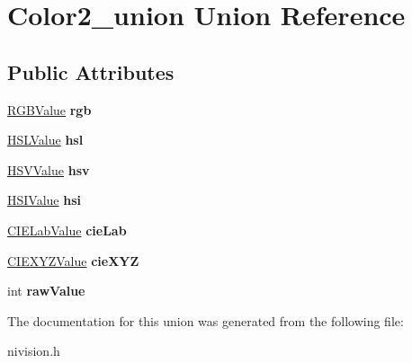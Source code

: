\hypertarget{unionColor2__union}{
\section{Color2\_\-union Union Reference}
\label{unionColor2__union}
}
\subsection*{Public Attributes}
\begin{DoxyCompactItemize}
\item 
\hypertarget{unionColor2__union_a80cbbcacb2b7b797451fd6848294b5d8}{
\hyperlink{structRGBValue__struct}{RGBValue} {\bfseries rgb}}
\label{unionColor2__union_a80cbbcacb2b7b797451fd6848294b5d8}

\item 
\hypertarget{unionColor2__union_a68ca8d690d2c0e9e8441b41ef8e46390}{
\hyperlink{structHSLValue__struct}{HSLValue} {\bfseries hsl}}
\label{unionColor2__union_a68ca8d690d2c0e9e8441b41ef8e46390}

\item 
\hypertarget{unionColor2__union_aa3e35262e49838b6399f193ba04b8925}{
\hyperlink{structHSVValue__struct}{HSVValue} {\bfseries hsv}}
\label{unionColor2__union_aa3e35262e49838b6399f193ba04b8925}

\item 
\hypertarget{unionColor2__union_a8491abb537c1c5edf05b50f0533207f0}{
\hyperlink{structHSIValue__struct}{HSIValue} {\bfseries hsi}}
\label{unionColor2__union_a8491abb537c1c5edf05b50f0533207f0}

\item 
\hypertarget{unionColor2__union_a63de8b4911f4638c7197b82130cb7d11}{
\hyperlink{structCIELabValue__struct}{CIELabValue} {\bfseries cieLab}}
\label{unionColor2__union_a63de8b4911f4638c7197b82130cb7d11}

\item 
\hypertarget{unionColor2__union_a146246adceafca16c845453cf27a231c}{
\hyperlink{structCIEXYZValue__struct}{CIEXYZValue} {\bfseries cieXYZ}}
\label{unionColor2__union_a146246adceafca16c845453cf27a231c}

\item 
\hypertarget{unionColor2__union_aa3d1d3760c0a471d565ac9d9f2458959}{
int {\bfseries rawValue}}
\label{unionColor2__union_aa3d1d3760c0a471d565ac9d9f2458959}

\end{DoxyCompactItemize}


The documentation for this union was generated from the following file:\begin{DoxyCompactItemize}
\item 
nivision.h\end{DoxyCompactItemize}
